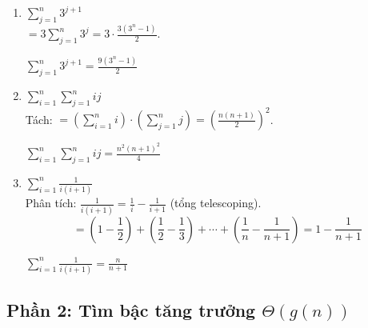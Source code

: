\documentclass[12pt,a4paper]{article}
\begin{document}
\begin{enumerate}[label=\textbf{\alph*.}]
  \begin{resultbox}
  $\displaystyle\sum_{i=0}^{n-1} i(i+1) = \frac{n(n-1)(n+1)}{3}$
  \end{resultbox}

  \bigskip

  \item $\displaystyle\sum_{j=1}^{n} 3^{j+1}$ \\[4pt]
  $= 3\displaystyle\sum_{j=1}^{n} 3^j = 3 \cdot \frac{3(3^n - 1)}{2}$.

  \begin{resultbox}
  $\displaystyle\sum_{j=1}^{n} 3^{j+1} = \frac{9(3^n - 1)}{2}$
  \end{resultbox}

  \bigskip

  \item $\displaystyle\sum_{i=1}^{n}\sum_{j=1}^{n} ij$ \\[4pt]
  Tách: $= \left(\displaystyle\sum_{i=1}^{n} i\right) \cdot \left(\sum_{j=1}^{n} j\right) = \left(\frac{n(n+1)}{2}\right)^2$.

  \begin{resultbox}
  $\displaystyle\sum_{i=1}^{n}\sum_{j=1}^{n} ij = \frac{n^2(n+1)^2}{4}$
  \end{resultbox}

  \bigskip

  \item $\displaystyle\sum_{i=1}^{n} \frac{1}{i(i+1)}$ \\[4pt]
  Phân tích: $\frac{1}{i(i+1)} = \frac{1}{i} - \frac{1}{i+1}$ (tổng telescoping).
  \[
    = \left(1 - \frac{1}{2}\right) + \left(\frac{1}{2} - \frac{1}{3}\right) + \cdots + \left(\frac{1}{n} - \frac{1}{n+1}\right) = 1 - \frac{1}{n+1}
  \]

  \begin{resultbox}
  $\displaystyle\sum_{i=1}^{n} \frac{1}{i(i+1)} = \frac{n}{n+1}$
  \end{resultbox}

\end{enumerate}

\subsection{Phần 2: Tìm bậc tăng trưởng $\Theta(g(n))$}
\end{document}
